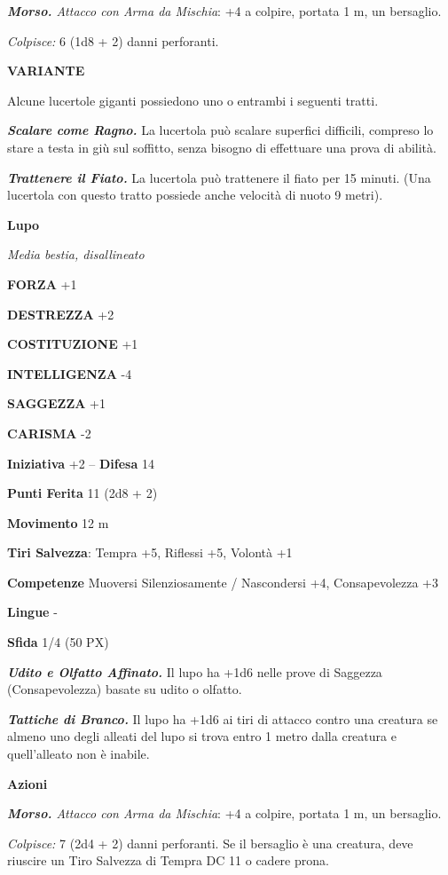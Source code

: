 \begin{multicols}{2}
\textit{\textbf{Morso.} Attacco con Arma da Mischia}: +4 a colpire, portata 1 m, un bersaglio.

\textit{Colpisce:} 6 (1d8 + 2) danni perforanti.

\textbf{VARIANTE}

Alcune lucertole giganti possiedono uno o entrambi i seguenti tratti.

\textit{\textbf{Scalare come Ragno.}} La lucertola può scalare superfici difficili, compreso lo stare a testa in giù sul soffitto, senza bisogno di effettuare una prova di abilità.

\textit{\textbf{Trattenere il Fiato.}} La lucertola può trattenere il fiato per 15 minuti. (Una lucertola con questo tratto possiede anche velocità di nuoto 9 metri).

\medskip\textbf{Lupo}

\textit{Media bestia, disallineato}

\textbf{FORZA} +1

\textbf{DESTREZZA} +2

\textbf{COSTITUZIONE} +1

\textbf{INTELLIGENZA} -4

\textbf{SAGGEZZA} +1

\textbf{CARISMA} -2

\textbf{Iniziativa} +2 -- \textbf{Difesa} 14

\textbf{Punti Ferita} 11 (2d8 + 2)

\textbf{Movimento} 12 m

\textbf{Tiri Salvezza}: Tempra +5, Riflessi +5, Volontà +1

\textbf{Competenze} Muoversi Silenziosamente / Nascondersi +4, Consapevolezza +3

\textbf{Lingue} -

\textbf{Sfida} 1/4 (50 PX)

\textit{\textbf{Udito e Olfatto Affinato.}} Il lupo ha +1d6 nelle prove di Saggezza (Consapevolezza) basate su udito o olfatto.

\textit{\textbf{Tattiche di Branco.}} Il lupo ha +1d6 ai tiri di attacco contro una creatura se almeno uno degli alleati del lupo si trova entro 1 metro dalla creatura e quell'alleato non è inabile.

\textbf{Azioni}

\textit{\textbf{Morso.} Attacco con Arma da Mischia}: +4 a colpire, portata 1 m, un bersaglio.

\textit{Colpisce:} 7 (2d4 + 2) danni perforanti. Se il bersaglio è una creatura, deve riuscire un Tiro Salvezza di Tempra DC 11 o cadere prona.


\end{multicols}
